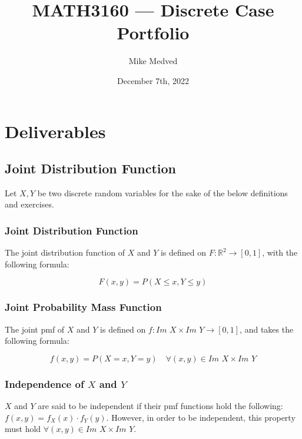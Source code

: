 \documentclass{article}
\title{MATH3160 — Discrete Case Portfolio}
\author{Mike Medved}
\date{December 7th, 2022}
\begin{document}
\maketitle

\section{Deliverables}

\subsection{Joint Distribution Function}

Let $X, Y$ be two discrete random variables for the sake of the below definitions and exercises.

\subsubsection{Joint Distribution Function}

The joint distribution function of $X$ and $Y$ is defined on $F \colon \mathbb{R}^2 \rightarrow [0,1]$, with the following formula:

\begin{equation*}
    F(x,y) = P(X \leq x, Y \leq y)
\end{equation*}

\subsubsection{Joint Probability Mass Function}

The joint pmf of $X$ and $Y$ is defined on $f \colon \textit{Im X} \times \textit{Im Y} \rightarrow [0,1]$, and takes the following formula:

\begin{equation*}
    f(x,y) = P(X = x, Y = y) \quad \forall (x,y) \in \textit{Im X} \times \textit{Im Y}
\end{equation*}

\subsubsection{Independence of $X$ and $Y$}

$X$ and $Y$ are said to be independent if their pmf functions hold the following: $f(x,y)=f_X(x) \cdot f_Y(y)$. However, in order to be independent, this property must hold $\forall (x,y) \in \textit{Im X} \times \textit{Im Y}$.
\end{document}
